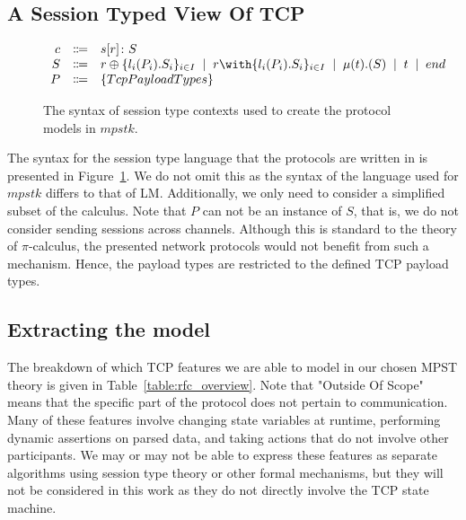 \subsection{A Session Typed View Of TCP}

\begin{figure}[H]
    \centering
        $
        \begin{array}{rcll}
        \ensuremath{c} & \Coloneqq & \ensuremath{s[r] \colon S} \\
        \ensuremath{S}
            & \Coloneqq & \ensuremath{r \oplus \{l_i(P_i).S_i\}_{i \in I}}
            \sep        \ensuremath{r \with \{l_i(P_i).S_i\}_{i \in I}}
            \sep        \ensuremath{\mu(t).(S)}
            \sep        \ensuremath{t}
            \sep        \ensuremath{end} \\
        \ensuremath{P}
            & \Coloneqq & \ensuremath{\{TcpPayloadTypes\}}
        \end{array}
        $
    \caption{The syntax of session type contexts used to create the protocol models in \ensuremath{mpstk}.} \label{fig:syntax}
\end{figure}

The syntax for the session type language that the protocols are written in is presented in Figure~\ref{fig:syntax}.
We do not omit this as the syntax of the language used for \ensuremath{mpstk} differs to that of LM.
Additionally, we only need to consider a simplified subset of the calculus.
Note that \ensuremath{P} can not be an instance of \ensuremath{S}, that is, we do not consider sending sessions across channels.
Although this is standard to the theory of \ensuremath{\pi}-calculus, the presented network protocols would not benefit from such a mechanism.
Hence, the payload types are restricted to the defined TCP payload types.

\subsection{Extracting the model}

The breakdown of which TCP features we are able to model in our chosen MPST theory is given in Table~\ref{table:rfc_overview}.
Note that "Outside Of Scope" means that the specific part of the protocol does not pertain to communication.
Many of these features involve changing state variables at runtime, performing dynamic assertions on parsed data, and taking actions that do not involve other participants.
We may or may not be able to express these features as separate algorithms using session type theory or other formal mechanisms, but they will not be considered in this work as they do not directly involve the TCP state machine.

